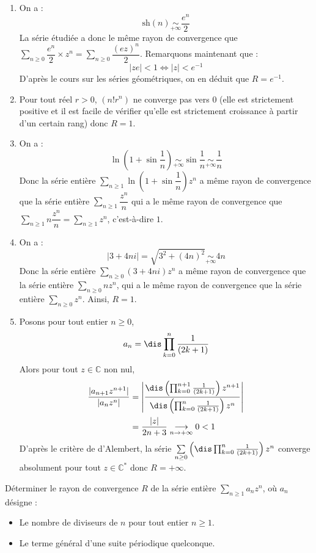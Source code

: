 \documentclass[a4paper,10pt]{report}
\newcommand{\Sum}[2]{\ensuremath{\textstyle{\sum\limits_{#1}^{#2}}}}
\begin{document}
\begin{enumerate}
\item  On a :
$$\textrm{sh}(n) \underset{+ \infty}{\sim} \dfrac{e^n}{2}$$
La série étudiée a donc le même rayon de convergence que $\Sum{n \geq 0}{}  \dfrac{e^n}{2} \times z^n = \Sum{n \geq 0}{}  \dfrac{(ez)^n}{2}$. Remarquons maintenant que :
$$ \vert ze \vert < 1 \Longleftrightarrow \vert z \vert < e^{-1}$$
D'après le cours sur les séries géométriques, on en déduit que $R=e^{-1}$.
\item Pour tout réel $r>0$, $(n!r^n)$ ne converge pas vers $0$ (elle est strictement positive et il est facile de vérifier qu'elle est strictement croissance à partir d'un certain rang) donc $R=1$.
\item On a :
\[
\ln\left(1+\sin\dfrac{1}{n}\right)\underset{+\infty}{\sim}\sin\dfrac{1}{n}\underset{+\infty}{\sim}\dfrac{1}{n}
\]
Donc la série entière $\Sum{n \geq 1}{}\ln\left(1+\sin\dfrac{1}{n}\right)z^n$ a même rayon de convergence que la série entière $\Sum{n \geq 1}{} \dfrac{z^n}{n}$ qui a le même rayon de convergence que $\Sum{n \geq 1}{} n\dfrac{z^n}{n} = \Sum{n \geq 1}{} z^n$, c'est-à-dire $1$.
\item On a :
\[
\vert 3+4ni\vert=\sqrt{3^2+(4n)^2}\underset{+\infty}{\sim}4n
\]
Donc la série entière $\Sum{n \geq 0}{} (3+4ni)z^n$ a même rayon de convergence que la série entière $\Sum{n \geq 0}{} nz^n$, qui a le même rayon de convergence que la série entière $\Sum{n \geq 0}{} z^n$. Ainsi, $R=1$.
\item Posons pour tout entier $n \geq 0$,
$$a_n = \dis \prod_{k=0}^n\dfrac{1}{(2k+1)} $$
Alors pour tout $z \in \mathbb{C}$ non nul, 
\begin{align*}
\dfrac{\vert a_{n+1} z^{n+1} \vert }{\vert a_n z^n \vert} & =\left\vert\dfrac{\dis \left(\prod_{k=0}^{n+1}\frac{1}{(2k+1)}\right)z^{n+1}}{\dis \left(\prod_{k=0}^n\frac{1}{(2k+1)}\right)z^n}\right\vert \\
& =\dfrac{\vert z\vert }{2n+3}\underset{n \rightarrow +\infty}{\longrightarrow}0<1
\end{align*}
D'après le critère de d'Alembert, la série $\Sum{n \geq 0}{} \left(\dis \prod_{k=0}^n\frac{1}{(2k+1)}\right)z^n$ converge absolument pour tout $z\in\mathbb{C}^*$ donc $R=+\infty$. 
\end{enumerate}

\begin{Exercice}{} Déterminer le rayon de convergence $R$ de la série entière $\Sum{n\geq 1}{} a_n z^n$, où $a_n$ désigne : 
\begin{itemize}
\item Le nombre de diviseurs de $n$ pour tout entier $n\geq 1$.
\item Le terme général d'une suite périodique quelconque. 
\end{itemize}
\end{Exercice}
\end{document}

